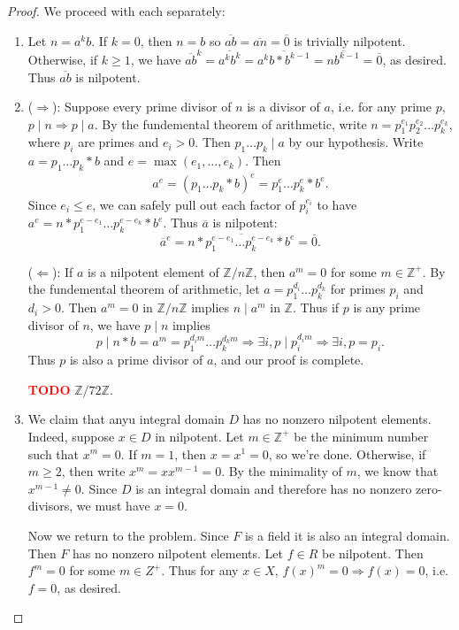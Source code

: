 \documentclass[12pt]{article}
\theoremstyle{remark}
\theoremstyle{named}
\newcommand{\todo}{\textcolor{red}{\textbf{TODO} }}
\newcommand{\Z}{\mathbb Z}
\begin{document}
\begin{proof}
    We proceed with each separately: 
    \begin{enumerate}
        \item Let \(n = a^kb\). If \(k = 0\), then \(n = b\) so \(\overline{ab} = \overline{an} = \overline{0}\) is trivially nilpotent. 
        Otherwise, if \(k \ge 1\), we have \(\overline{ab}^k = \overline{a^kb^k} = \overline{a^k b * b^{k - 1}} = \overline{nb^{k - 1}} = \overline{0}\), as desired. Thus \(\overline{ab}\) is nilpotent.

        \item (\(\Rightarrow\)): Suppose every prime divisor of \(n\) is a divisor of \(a\), i.e. for any prime \(p\), \(p \mid n \Rightarrow p \mid a\). By the fundemental theorem of arithmetic, write \(n = p_1^{e_1} p_2^{e_2} \dots p_k^{e_k}\), where \(p_i\) are primes and \(e_i > 0\). Then \(p_1 \dots p_k \mid a\) by our hypothesis. Write \(a = p_1 \dots p_k * b\) and \(e = \max(e_1, \dots, e_k)\). Then 
        \begin{align*}
            a^e = (p_1 \dots p_k * b)^e = p_1^e \dots p_k^e * b^e.
        \end{align*}
        Since \(e_i \le e\), we can safely pull out each factor of \(p_i^{e_i}\) to have \(a^e = n * p_1^{e - e_1} \dots p_k^{e - e_k} * b^e\). Thus \(\overline{a}\) is nilpotent:
        \[\overline{a}^e = \overline{n * p_1^{e - e_1} \dots p_k^{e - e_k} * b^e} = \overline{0}.\]

        (\(\Leftarrow\)): If \(a\) is a nilpotent element of \(\Z /n\Z\), then \(a^m = 0\) for some \(m \in \Z^+\). By the fundemental theorem of arithmetic, let \(a = p_1^{d_i} \dots p_k^{d_k}\) for primes \(p_i\) and \(d_i > 0\). Then \(a^m = 0\) in \(\Z / n\Z\) implies \(n \mid a^m\) in \(\Z\). Thus if \(p\) is any prime divisor of \(n\), we have \(p \mid n\) implies 
        \[p \mid n * b = a^m = p_1^{d_i m} \dots p_k^{d_k m} \Rightarrow \exists i, p \mid p_i^{d_i m} \Rightarrow \exists i, p = p_i.\]
        Thus \(p\) is also a prime divisor of \(a\), and our proof is complete.
        
        \todo \(\Z / 72\Z\).
        \item We claim that anyu integral domain \(D\) has no nonzero nilpotent elements. Indeed, suppose \(x \in D\) in nilpotent. Let \(m \in \Z^+\) be the minimum number such that \(x^m = 0\). If \(m = 1\), then \(x = x^1 = 0\), so we're done. Otherwise, if \(m \ge 2\), then write \(x^m = x x^{m - 1} = 0\). By the minimality of \(m\), we know that \(x^{m - 1} \neq 0\). Since \(D\) is an integral domain and therefore has no nonzero zero-divisors, we must have \(x = 0\).
        
        Now we return to the problem. Since \(F\) is a field it is also an integral domain. Then \(F\) has no nonzero nilpotent elements. Let \(f \in R\) be nilpotent. Then \(f^m = 0\) for some \(m \in Z^+\). Thus for any \(x \in X\), \(f(x)^m = 0 \Rightarrow f(x) = 0\), i.e. \(f = 0\), as desired.
    \end{enumerate}
\end{proof}
\end{document}
